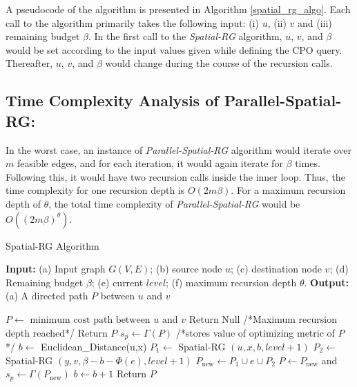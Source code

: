 A pseudocode of the algorithm is presented in Algorithm \ref{spatial_rg_algo}. Each call to the algorithm primarily takes the following input: (i)  $u$, (ii)  $v$ and (iii) remaining budget $\beta$. In the first call to the \textit{Spatial-RG} algorithm, $u$, $v$, and $\beta$ would be set according to the input values given while defining the CPO query. Thereafter, $u$, $v$, and $\beta$ would change during the course of the recursion calls.

\subsection{Time Complexity Analysis of Parallel-Spatial-RG:}

In the worst case, an instance of \textit{Parallel-Spatial-RG} algorithm would iterate over $m$ feasible edges, and for each iteration, it would again iterate for $\beta$ times. Following this, it would have two recursion calls inside the inner loop. Thus, the time complexity for one recursion depth is $O(2m\beta)$. For a maximum recursion depth of $\theta$, the total time complexity of \textit{Parallel-Spatial-RG} would be $O((2m\beta)^\theta )$.

\begin{algorithm}
\caption{Spatial-RG Algorithm} \label{spatial_rg_algo}
\textbf{Input: }(a) Input graph $G(V, E)$; (b) source node $u$; (c) destination node $v$; (d) Remaining budget $\beta$; (e) current $level$; (f) maximum recursion depth $\theta$.\newline
\textbf{Output: }(a) A directed path $P$ between $u$ and $v$\newline
\begin{algorithmic}[1]
\State $P \leftarrow \textrm{ minimum cost path between } u \textrm{ and } v$
    \State Return Null
\EndIf
{} /*Maximum recursion depth reached*/
    \State Return $P$
\EndIf
\State $s_p \leftarrow \Gamma(P)$ /*stores value of optimizing metric of $P$ */
    \State $b \leftarrow$ Euclidean\_Distance(u,x)
        \State $P_1 \leftarrow$ Spatial-RG $(u, x, b, level + 1)$
        \State $P_2 \leftarrow$ Spatial-RG $(y, v, \beta - b - \Phi (e), level + 1)$
        \State $P_\mathrm{new} \leftarrow P_1 \cup e \cup P_2$
            \State $P \leftarrow P_\mathrm{new}$ and $s_p \leftarrow \Gamma(P_\mathrm{new})$
        \EndIf
        \State $b \leftarrow b+1$
    \EndWhile
\EndFor
\State Return $P$
\end{algorithmic}
\end{algorithm}